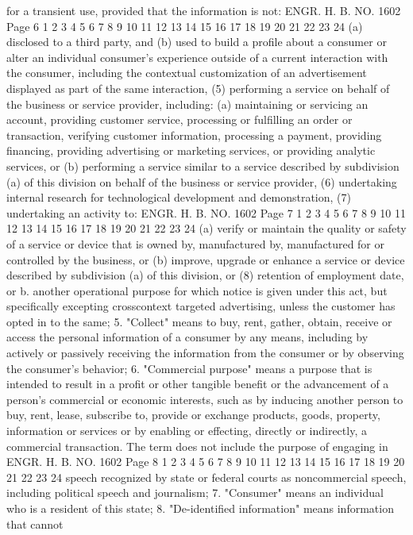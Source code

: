 for a transient use, provided that the
information is not:
ENGR. H. B. NO. 1602 Page 6
1
2
3
4
5
6
7
8
9
10
11
12
13
14
15
16
17
18
19
20
21
22
23
24
(a) disclosed to a third party, and
(b) used to build a profile about a consumer or
alter an individual consumer's experience
outside of a current interaction with the
consumer, including the contextual
customization of an advertisement displayed
as part of the same interaction,
(5) performing a service on behalf of the business or
service provider, including:
(a) maintaining or servicing an account,
providing customer service, processing or
fulfilling an order or transaction,
verifying customer information, processing a
payment, providing financing, providing
advertising or marketing services, or
providing analytic services, or
(b) performing a service similar to a service
described by subdivision (a) of this
division on behalf of the business or
service provider,
(6) undertaking internal research for technological
development and demonstration,
(7) undertaking an activity to:
ENGR. H. B. NO. 1602 Page 7
1
2
3
4
5
6
7
8
9
10
11
12
13
14
15
16
17
18
19
20
21
22
23
24
(a) verify or maintain the quality or safety of
a service or device that is owned by,
manufactured by, manufactured for or
controlled by the business, or
(b) improve, upgrade or enhance a service or
device described by subdivision (a) of this
division, or
(8) retention of employment date, or
b. another operational purpose for which notice is given
under this act, but specifically excepting crosscontext targeted advertising, unless the customer has
opted in to the same;
5. "Collect" means to buy, rent, gather, obtain, receive or
access the personal information of a consumer by any means,
including by actively or passively receiving the information from
the consumer or by observing the consumer's behavior;
6. "Commercial purpose" means a purpose that is intended to
result in a profit or other tangible benefit or the advancement of a
person's commercial or economic interests, such as by inducing
another person to buy, rent, lease, subscribe to, provide or
exchange products, goods, property, information or services or by
enabling or effecting, directly or indirectly, a commercial
transaction. The term does not include the purpose of engaging in 
ENGR. H. B. NO. 1602 Page 8
1
2
3
4
5
6
7
8
9
10
11
12
13
14
15
16
17
18
19
20
21
22
23
24
speech recognized by state or federal courts as noncommercial
speech, including political speech and journalism;
7. "Consumer" means an individual who is a resident of this
state;
8. "De-identified information" means information that cannot
